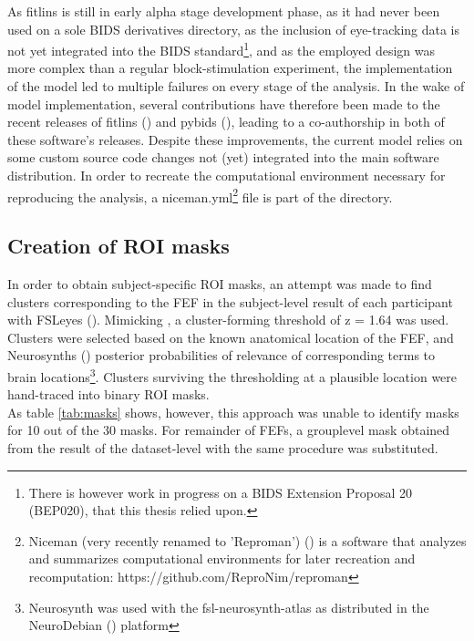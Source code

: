 \documentclass[a4paper, 12pt]{scrreprt}
\begin{document}
As fitlins is still in early alpha stage development phase, as it had never been used on a sole BIDS derivatives directory, as the inclusion of eye-tracking data is not yet integrated into the BIDS standard\footnote{There is however work in progress on a BIDS Extension Proposal 20 (BEP020), that this thesis relied upon.}, and as the employed design was more complex than a regular block-stimulation experiment, the implementation of the model led to multiple failures on every stage of the analysis. In the wake of model implementation, several contributions have therefore been made to the recent releases of fitlins (\cite{markiewicz_christopher_j_2019_2555453}) and pybids (\cite{yarkoni_tal_2019_2555449}), leading to a co-authorship in both of these software's releases.
Despite these improvements, the current model relies on some custom source code changes not (yet) integrated into the main software distribution. In order to recreate the computational environment necessary for reproducing the analysis, a niceman.yml\footnote{Niceman (very recently renamed to 'Reproman') (\cite{yaroslav_halchenko_2018_2403222}) is a software that analyzes and summarizes computational environments for later recreation and recomputation: https://github.com/ReproNim/reproman} file is part of the directory. 

\subsection{Creation of ROI masks}\label{c2:masks}
In order to obtain subject-specific ROI masks, an attempt was made to find clusters corresponding to the FEF in the subject-level result of each participant with FSLeyes (\cite{mccarthy_paul_2018_1887737}). Mimicking \textcite{sengupta2016studyforrest}, a cluster-forming threshold of z = 1.64 was used. Clusters were selected based on the known anatomical location of the FEF, and Neurosynths (\cite{yarkoni2011neurosynth}) posterior probabilities of relevance of corresponding terms to brain locations\footnote{Neurosynth was used with the fsl-neurosynth-atlas as distributed in the NeuroDebian (\cite{10.3389/fninf.2012.00022}) platform}. Clusters surviving the thresholding at a plausible location were hand-traced into binary ROI masks. \\
As table \ref{tab:masks} shows, however, this approach was unable to identify masks for 10 out of the 30 masks. For remainder of FEFs, a grouplevel mask obtained from the result of the dataset-level with the same procedure was substituted.
\end{document}
